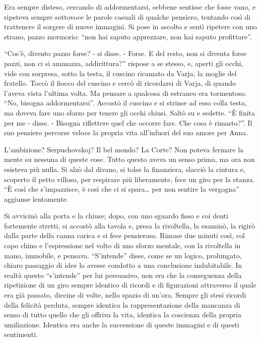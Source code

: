 Era sempre disteso, cercando di addormentarsi, sebbene sentisse che fosse vano, e ripeteva sempre sottovoce le parole casuali di qualche pensiero, tentando così di trattenere il sorgere di nuove immagini. Si pose in ascolto e sentì ripetere con uno strano, pazzo mormorio: ``non hai saputo apprezzare, non hai saputo profittare''. 

``Cos'è, divento pazzo forse? - si disse. - Forse. E del resto, non si diventa forse pazzi, non ci si ammazza, addirittura?'' rispose a se stesso, e, aperti gli occhi, vide con sorpresa, sotto la testa, il cuscino ricamato da Varja, la moglie del fratello. Toccò il fiocco del cuscino e cercò di ricordarsi di Varja, di quando l'aveva vista l'ultima volta. Ma pensare a qualcosa di estraneo era tormentoso. ``No, bisogna addormentarsi''. Accostò il cuscino e si strinse ad esso colla testa, ma doveva fare uno sforzo per tenere gli occhi chiusi. Saltò su e sedette. ``È finita per me - disse. - Bisogna riflettere quel che occorre fare. Che cosa è rimasto?''. Il suo pensiero percorse veloce la propria vita all'infuori del suo amore per Anna. 

L'ambizione? Serpuchovskoj? Il bel mondo? La Corte? Non poteva fermare la mente su nessuna di queste cose. Tutto questo aveva un senso prima, ma ora non esisteva più nulla. Si alzò dal divano, si tolse la finanziera, slacciò la cintura e, scoperto il petto villoso, per respirare più liberamente, fece un giro per la stanza. ``È così che s'impazzisce, è così che ci si spara\ldots{} per non sentire la vergogna'' aggiunse lentamente. 

Si avvicinò alla porta e la chiuse; dopo, con uno sguardo fisso e coi denti fortemente stretti, si accostò alla tavola e, presa la rivoltella, la esaminò, la rigirò dalla parte della canna carica e si fece pensieroso. Rimase due minuti così, col capo chino e l'espressione nel volto di uno sforzo mentale, con la rivoltella in mano, immobile, e pensava. ``S'intende'' disse, come se un logico, prolungato, chiaro passaggio di idee lo avesse condotto a una conclusione indubitabile. In realtà questo ``s'intende'' per lui persuasivo, non era che la conseguenza della ripetizione di un giro sempre identico di ricordi e di figurazioni attraverso il quale era già passato, diecine di volte, nello spazio di un'ora. Sempre gli stesi ricordi della felicità perduta, sempre identica la rappresentazione della mancanza di senso di tutto quello che gli offriva la vita, identica la coscienza della propria umiliazione. Identica era anche la successione di queste immagini e di questi sentimenti. 

